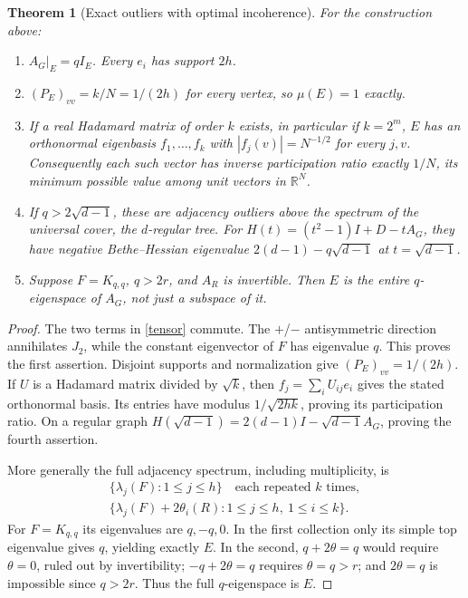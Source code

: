 \documentclass[11pt]{article}
\newtheorem{theorem}{Theorem}
\newcommand{\R}{\mathbb R}
\begin{document}
\begin{theorem}[Exact outliers with optimal incoherence]
For the construction above:
\begin{enumerate}
\item $A_G|_E=qI_E$. Every $e_i$ has support $2h$.
\item $(P_E)_{vv}=k/N=1/(2h)$ for every vertex, so $\mu(E)=1$ exactly.
\item If a real Hadamard matrix of order $k$ exists, in particular if
      $k=2^m$, $E$ has an orthonormal eigenbasis $f_1,\ldots,f_k$ with
      $|f_j(v)|=N^{-1/2}$ for every $j,v$. Consequently each such vector
      has inverse participation ratio exactly $1/N$, its minimum possible
      value among unit vectors in $\R^N$.
\item If $q>2\sqrt{d-1}$, these are adjacency outliers above the spectrum
      of the universal cover, the $d$-regular tree. For
      $H(t)=(t^2-1)I+D-tA_G$, they have negative Bethe--Hessian eigenvalue
      $2(d-1)-q\sqrt{d-1}$ at $t=\sqrt{d-1}$.
\item Suppose $F=K_{q,q}$, $q>2r$, and $A_R$ is invertible. Then $E$ is
      the entire $q$-eigenspace of $A_G$, not just a subspace of it.
\end{enumerate}
\end{theorem}
\begin{proof}
The two terms in \eqref{tensor} commute. The $+$/$-$ antisymmetric direction
annihilates $J_2$, while the constant eigenvector of $F$ has eigenvalue $q$.
This proves the first assertion. Disjoint supports and normalization give
$(P_E)_{vv}=1/(2h)$. If $U$ is a Hadamard matrix divided by $\sqrt{k}$,
then $f_j=\sum_iU_{ij}e_i$ gives the stated orthonormal basis. Its entries
have modulus $1/\sqrt{2hk}$, proving its participation ratio. On a regular
graph $H(\sqrt{d-1})=2(d-1)I-\sqrt{d-1}A_G$, proving the fourth assertion.

More generally the full adjacency spectrum, including multiplicity, is
\begin{equation}
\begin{gathered}
 \{\lambda_j(F):1\leq j\leq h\}\quad\text{each repeated $k$ times},\\
 \{\lambda_j(F)+2\theta_i(R):1\leq j\leq h,\ 1\leq i\leq k\}.
\end{gathered}
 \label{spec}
\end{equation}
For $F=K_{q,q}$ its eigenvalues are $q,-q,0$. In the first collection only
its simple top eigenvalue gives $q$, yielding exactly $E$. In the second,
$q+2\theta=q$ would require $\theta=0$, ruled out by invertibility;
$-q+2\theta=q$ requires $\theta=q>r$; and $2\theta=q$ is impossible since
$q>2r$. Thus the full $q$-eigenspace is $E$.
\end{proof}
\end{document}
